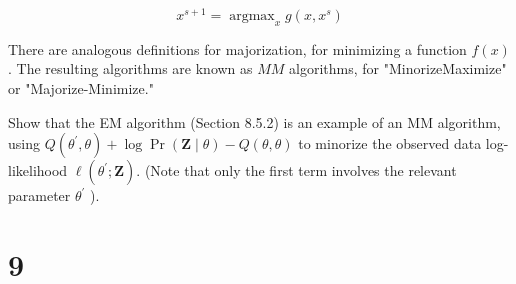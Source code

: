\documentclass[10pt]{article}
\begin{document}
\begin{equation*}
x^{s+1}=\operatorname{argmax}_{x} g\left(x, x^{s}\right) \tag{8.63}
\end{equation*}


There are analogous definitions for majorization, for minimizing a function $f(x)$. The resulting algorithms are known as $M M$ algorithms, for "MinorizeMaximize" or "Majorize-Minimize."

Show that the EM algorithm (Section 8.5.2) is an example of an MM algorithm, using $Q\left(\theta^{\prime}, \theta\right)+\log \operatorname{Pr}(\mathbf{Z} \mid \theta)-Q(\theta, \theta)$ to minorize the observed data log-likelihood $\ell\left(\theta^{\prime} ; \mathbf{Z}\right)$. (Note that only the first term involves the relevant parameter $\theta^{\prime}$ ).

\section*{9}
\end{document}
